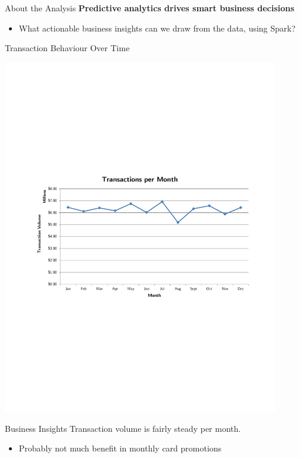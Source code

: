 \documentclass[xcolor=dvipsnames]{beamer}
\begin{document}
\begin{frame}[t]{About the Analysis}
	\vspace{6pt}
	\textbf{Predictive analytics drives smart business decisions}
	\begin{itemize}
		\item What actionable business insights can we draw from the data, using Spark?
	\end{itemize}
\end{frame}


\begin{frame}[t]{Transaction Behaviour Over Time}
	\vspace{-4pt}
	\centerline{\includegraphics[width=0.9\textwidth]{transactions-per-month}}
	\vspace{-8pt}
	\begin{block}{Business Insights}
		\small
		Transaction volume is fairly steady per month.\\[-8pt]
		\begin{itemize}
			\item Probably not much benefit in monthly card promotions
		\end{itemize}
	\end{block}
\end{frame}
\end{document}
